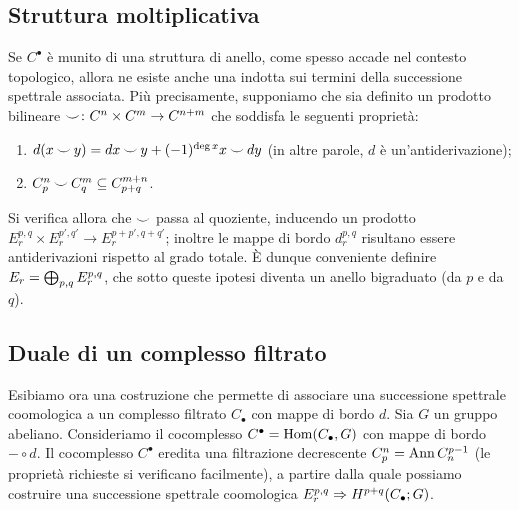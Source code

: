 \subsection{Struttura moltiplicativa}\label{cohomological-spectral-sequence:multiplicative-structure}
Se $C^\bullet$ è munito di una struttura di anello, come spesso accade nel contesto topologico, allora ne esiste anche una indotta sui termini della successione spettrale associata. Più precisamente, supponiamo che sia definito un prodotto bilineare $\map{\cupp}{C^n\times C^m}{C^{n+m}}$ che soddisfa le seguenti proprietà:
\begin{enumerate}
\item $d(x\mathbin{\smile} y)=dx\mathbin{\smile} y+(-1)^{\deg x}x\mathbin{\smile} dy$ (in altre parole, $d$ è un'antiderivazione);
\item $C^n_p\mathbin{\smile} C^m_q\subseteq C^{m+n}_{p+q}$.
\end{enumerate}
Si verifica  allora che $\mathbin{\smile}$ passa al quoziente, inducendo un prodotto $E^{p,q}_r\times E^{p',q'}_r\to E^{p+p',q+q'}_r$; inoltre le mappe di bordo $d^{p,q}_r$ risultano essere antiderivazioni rispetto al grado totale. È dunque conveniente definire $E_r=\bigoplus_{p,q}E^{p,q}_r$, che sotto queste ipotesi diventa un anello bigraduato (da $p$ e da $q$).

\subsection{Duale di un complesso filtrato}\label{cohomological-spectral-sequence:dual-complex}
Esibiamo ora una costruzione che permette di associare una successione spettrale coomologica a un complesso filtrato $C_\bullet$ con mappe di bordo $d$. Sia $G$ un gruppo abeliano. Consideriamo il cocomplesso $C^\bullet=\operatorname{Hom}(C_\bullet,G)$ con mappe di bordo $-\circ d$. Il cocomplesso $C^\bullet$ eredita una filtrazione decrescente $C^n_p=\operatorname{Ann} C_n^{p-1}$ (le proprietà richieste si verificano facilmente), a partire dalla quale possiamo costruire una successione spettrale coomologica $E^{p,q}_r\Rightarrow H^{p+q}(C_\bullet;G)$.

